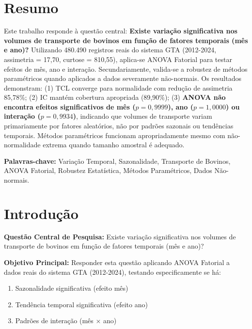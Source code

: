 \documentclass[12pt,a4paper]{article}
\begin{document}
\newpage
\section*{Resumo}

Este trabalho responde à questão central: \textbf{Existe variação significativa nos volumes de transporte de bovinos em função de fatores temporais (mês e ano)?} Utilizando 480.490 registros reais do sistema GTA (2012-2024, assimetria = 17,70, curtose = 810,55), aplica-se ANOVA Fatorial para testar efeitos de mês, ano e interação. Secundariamente, valida-se a robustez de métodos paramétricos quando aplicados a dados severamente não-normais. Os resultados demonstram: (1) TCL converge para normalidade com redução de assimetria 85,78\%; (2) IC mantém cobertura apropriada (89,90\%); (3) \textbf{ANOVA não encontra efeitos significativos de mês ($p=0,9999$), ano ($p=1,0000$) ou interação ($p=0,9934$)}, indicando que volumes de transporte variam primariamente por fatores aleatórios, não por padrões sazonais ou tendências temporais. Métodos paramétricos funcionam apropriadamente mesmo com não-normalidade extrema quando tamanho amostral é adequado.

\noindent \textbf{Palavras-chave:} Variação Temporal, Sazonalidade, Transporte de Bovinos, ANOVA Fatorial, Robustez Estatística, Métodos Paramétricos, Dados Não-normais.

\newpage

\tableofcontents
\newpage

\section{Introdução}

\textbf{Questão Central de Pesquisa:} Existe variação significativa nos volumes de transporte de bovinos em função de fatores temporais (mês e ano)?

\textbf{Objetivo Principal:} Responder esta questão aplicando ANOVA Fatorial a dados reais do sistema GTA (2012-2024), testando especificamente se há:
\begin{enumerate}
    \item Sazonalidade significativa (efeito mês)
    \item Tendência temporal significativa (efeito ano)
    \item Padrões de interação (mês × ano)
\end{enumerate}
\end{document}

